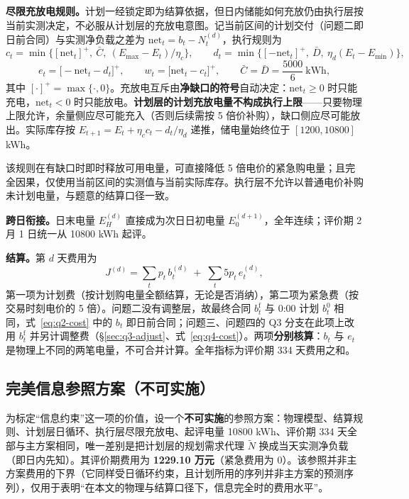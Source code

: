 \textbf{尽限充放电规则。}计划一经锁定即为结算依据，但日内储能如何充放仍由执行层按当前实测决定，不必服从计划层的充放电意图。记当前区间的计划交付（问题二即日前合同）与实测净负载之差为 $\mathrm{net}_t=b_t-N_t^{(d)}$，执行规则为
\begin{equation}
  c_t=\min\bigl\{[\mathrm{net}_t]^+,\ \bar C,\ (E_{\max}-E_t)/\eta_c\bigr\},\qquad
  d_t=\min\bigl\{[-\mathrm{net}_t]^+,\ \bar D,\ \eta_d(E_t-E_{\min})\bigr\},
  \label{eq:q2-exec}
\end{equation}
\begin{equation}
  e_t=\bigl[-\mathrm{net}_t-d_t\bigr]^+,\qquad
  w_t=\bigl[\mathrm{net}_t-c_t\bigr]^+ ,\qquad
  \bar C=\bar D=\frac{5000}{6}\ \text{kWh},
  \label{eq:q2-resid}
\end{equation}
其中 $[\cdot]^+=\max\{\cdot,0\}$。充放电互斥由\textbf{净缺口的符号}自动决定：$\mathrm{net}_t\ge0$ 时只能充电，$\mathrm{net}_t<0$ 时只能放电。\textbf{计划层的计划充放电量不构成执行上限}——只要物理上限允许，余量侧应尽可能充入（否则后续需按 5 倍价补购），缺口侧应尽可能放出。实际库存按 $E_{t+1}=E_t+\eta_c c_t-d_t/\eta_d$ 递推，储电量始终位于 $[1200,10800]$ kWh。

该规则在有缺口时即时释放可用电量，可直接降低 5 倍电价的紧急购电量；且完全因果，仅使用当前区间的实测值与当前实际库存。执行层不允许以普通电价补购未计划电量，与题意的结算口径一致。

\textbf{跨日衔接。}日末电量 $E_H^{(d)}$ 直接成为次日日初电量 $E_0^{(d+1)}$，全年连续；评价期 2 月 1 日统一从 10800 kWh 起评。

\textbf{结算。}第 $d$ 天费用为
\begin{equation}
  J^{(d)}=\sum_{t}p_t\,b_t^{(d)}\;+\;\sum_{t}5p_t\,e_t^{(d)} ,
  \label{eq:q2-cost}
\end{equation}
第一项为计划费（按计划购电量全额结算，无论是否消纳），第二项为紧急费（按交易时刻电价的 5 倍）。问题二没有调整层，故最终合同 $b^{\mathrm f}_t$ 与 0:00 计划 $b^{0}_t$ 相同，式~\eqref{eq:q2-cost} 中的 $b_t$ 即日前合同；问题三、问题四的 Q3 分支在此项上改用 $b^{\mathrm f}_t$ 并另计调整费（\S\ref{sec:q3-adjust}、式~\eqref{eq:q4-cost}）。两项\textbf{分别核算}：$b_t$ 与 $e_t$ 是物理上不同的两笔电量，不可合并计算。全年指标为评价期 334 天费用之和。

\subsection{完美信息参照方案（不可实施）}

为标定``信息约束''这一项的价值，设一个\textbf{不可实施}的参照方案：物理模型、结算规则、计划层日循环、执行层尽限充放电、起评电量 10800 kWh、评价期 334 天全部与主方案相同，唯一差别是把计划层的规划需求代理 $\widetilde N$ 换成当天实测净负载（即日内先知）。其评价期费用为 \textbf{1229.10 万元}（紧急费用为 0）。该参照并非主方案费用的下界（它同样受日循环约束，且计划所用的序列并非主方案的预测序列），仅用于表明``在本文的物理与结算口径下，信息完全时的费用水平''。

